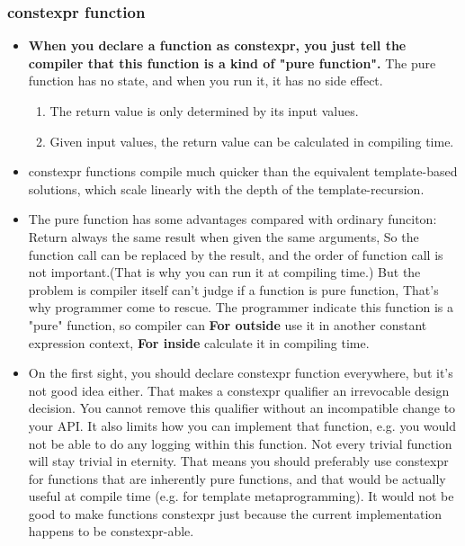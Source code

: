 \documentclass[a4paper,11pt,twoside]{book}
\begin{document}
\subsubsection{constexpr function}
\begin{itemize}
	\item \textbf{When you declare a function as constexpr, you just tell the compiler that this function is a kind of "pure function".} The pure function has no state, and when you run it, it has no side effect.
	\begin{enumerate}
		\item The return value is only determined by its input values.
		\item Given input values, the return value can be calculated in compiling time. 
	\end{enumerate}

	\item constexpr functions compile much quicker than the equivalent template-based solutions, which scale linearly with the depth of the template-recursion.
	
	\item The pure function has some advantages compared with ordinary funciton: Return always the same result when given the same arguments, So the function call can be replaced by the result, and the order of function call is not important.(That is why you can run it at compiling time.) But the problem is compiler itself can't judge if a function is pure function, That's why programmer come to rescue. The programmer indicate this function is a "pure" function, so compiler can \textbf{For outside} use it in another constant expression context, \textbf{For inside} calculate it in compiling time. 
	
	\item On the first sight, you should declare constexpr function everywhere, but it's not good idea either. That makes a constexpr qualifier an irrevocable design decision. You cannot remove this qualifier without an incompatible change to your API. It also limits how you can implement that function, e.g. you would not be able to do any logging within this function. Not every trivial function will stay trivial in eternity. That means you should preferably use constexpr for functions that are inherently pure functions, and that would be actually useful at compile time (e.g. for template metaprogramming). It would not be good to make functions constexpr just because the current implementation happens to be constexpr-able.
	

\end{itemize}
\end{document}
